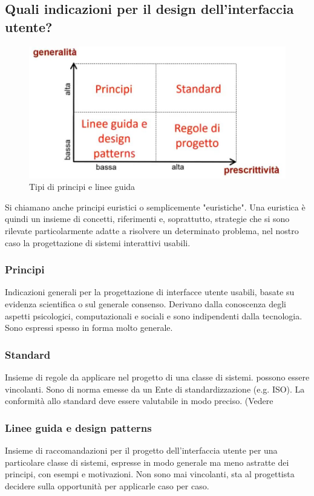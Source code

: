 \documentclass[11pt,a4paper]{book}
\begin{document}
\subsection{Quali indicazioni per il design dell'interfaccia utente?}
\begin{figure}[h!]
	\begin{center}
		\includegraphics[scale=0.6]{img/013.jpg}
		\caption{Tipi di principi e linee guida}
		\label{fig: 013}
	\end{center}
\end{figure}

Si chiamano anche principi euristici o semplicemente "euristiche". Una euristica è quindi un insieme di concetti, riferimenti e, soprattutto, strategie che si sono rilevate particolarmente adatte a risolvere un determinato problema, nel nostro caso la progettazione di sistemi interattivi usabili.
\subsubsection{Principi}
Indicazioni generali per la progettazione di interfacce utente usabili, basate su evidenza scientifica o sul generale consenso. Derivano dalla conoscenza degli aspetti psicologici, computazionali e sociali e sono indipendenti dalla tecnologia. Sono espressi spesso in forma molto generale.

\subsubsection{Standard}
Insieme di regole da applicare nel progetto di una classe di sistemi. possono essere vincolanti. Sono di norma emesse da un Ente di standardizzazione (e.g. ISO). La conformità allo standard deve essere valutabile in modo preciso. (Vedere \pageref{par: ISO 9241}

\subsubsection{Linee guida e design patterns}
Insieme di raccomandazioni per il progetto dell'interfaccia utente per una particolare classe di sistemi, espresse in modo generale ma meno astratte dei principi, con esempi e motivazioni. Non sono mai vincolanti, sta al progettista decidere sulla opportunità per applicarle caso per caso.
\end{document}
